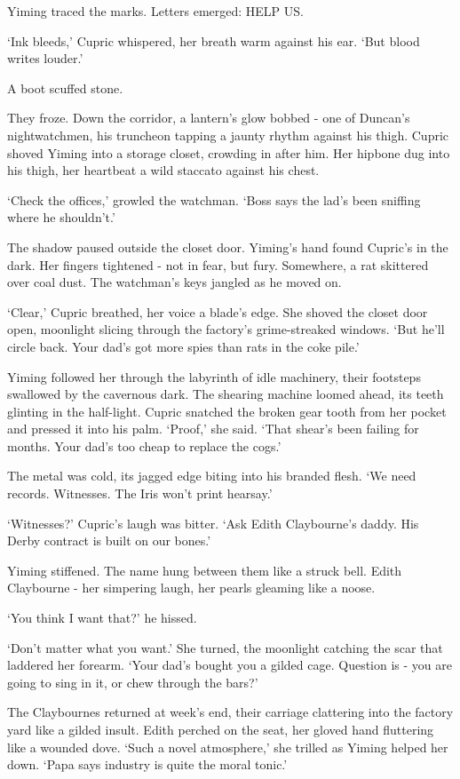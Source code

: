 Yiming traced the marks. Letters emerged: HELP US.

`Ink bleeds,' Cupric whispered, her breath warm against his ear. `But blood writes louder.'

A boot scuffed stone.

They froze. Down the corridor, a lantern's glow bobbed - one of Duncan's nightwatchmen, his truncheon tapping a jaunty rhythm against his thigh. Cupric shoved Yiming into a storage closet, crowding in after him. Her hipbone dug into his thigh, her heartbeat a wild staccato against his chest.

`Check the offices,' growled the watchman. `Boss says the lad's been sniffing where he shouldn't.'

The shadow paused outside the closet door. Yiming's hand found Cupric's in the dark. Her fingers tightened - not in fear, but fury. Somewhere, a rat skittered over coal dust. The watchman's keys jangled as he moved on.

`Clear,' Cupric breathed, her voice a blade's edge. She shoved the closet door open, moonlight slicing through the factory's grime-streaked windows. `But he'll circle back. Your dad's got more spies than rats in the coke pile.'

Yiming followed her through the labyrinth of idle machinery, their footsteps swallowed by the cavernous dark. The shearing machine loomed ahead, its teeth glinting in the half-light. Cupric snatched the broken gear tooth from her pocket and pressed it into his palm. `Proof,' she said. `That shear's been failing for months. Your dad's too cheap to replace the cogs.'

The metal was cold, its jagged edge biting into his branded flesh. `We need records. Witnesses. The Iris won't print hearsay.'

`Witnesses?' Cupric's laugh was bitter. `Ask Edith Claybourne's daddy. His Derby contract is built on our bones.'

Yiming stiffened. The name hung between them like a struck bell. Edith Claybourne - her simpering laugh, her pearls gleaming like a noose.

`You think I want that?' he hissed.

`Don't matter what you want.' She turned, the moonlight catching the scar that laddered her forearm. `Your dad's bought you a gilded cage. Question is - you are going to sing in it, or chew through the bars?'

The Claybournes returned at week's end, their carriage clattering into the factory yard like a gilded insult. Edith perched on the seat, her gloved hand fluttering like a wounded dove. `Such a novel atmosphere,' she trilled as Yiming helped her down. `Papa says industry is quite the moral tonic.'

